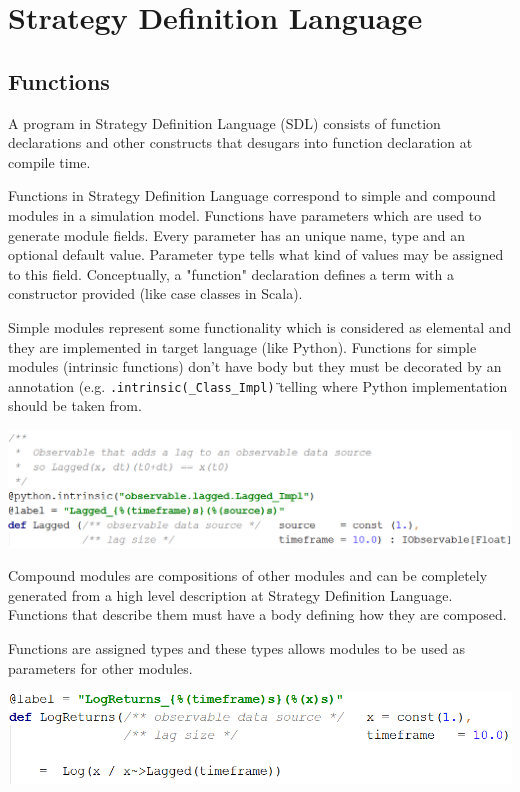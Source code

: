 \documentclass[a4paper,11pt]{article}
\begin{document}
\section{Strategy Definition Language}\label{SDL}

\subsection{Functions}

A program in Strategy Definition Language (SDL) consists of function declarations and other constructs that desugars into function declaration at compile time.

Functions in Strategy Definition Language correspond to simple and compound modules in a simulation model. Functions have parameters which are used to generate module fields. Every parameter has an unique name, type and an optional default value. Parameter type tells what kind of values may be assigned to this field. Conceptually, a "function" declaration defines a term with a constructor provided (like case classes in Scala).

Simple modules represent some functionality which is considered as elemental and they are implemented in target language (like Python). Functions for simple modules (intrinsic functions) don't have body but they must be decorated by an annotation (e.g. \texttt{\@python.intrinsic(\"\_Class\_Impl\")} telling where Python implementation should be taken from.

\centerline{\includegraphics[width=1\linewidth]{talks/lagged.png}}

Compound modules are compositions of other modules and can be completely generated from a high level description at Strategy Definition Language. Functions that describe them must have a body defining how they are composed.

Functions are assigned types and these types allows modules to be used as parameters for other modules.

\centerline{\includegraphics[width=1\linewidth]{talks/logreturns.png}}
\end{document}
